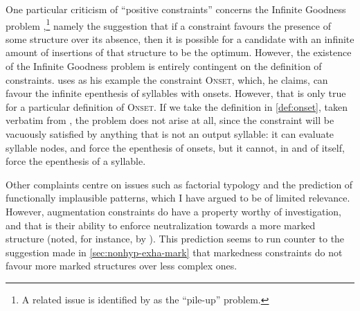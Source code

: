 One particular criticism of \enquote{positive constraints} concerns the Infinite Goodness problem \citep{prince07,kimperng:_posit_harmon_serial},\footnote{A related issue is identified by \citet{delacy2006} as the \enquote{pile\hyp up} problem.} namely the suggestion that if a constraint favours the presence of some structure over its absence, then it is possible for a candidate with an infinite amount of insertions of that structure to be the optimum. However, the existence of the Infinite Goodness problem is entirely contingent on the definition of constraints. \citet{kimperng:_posit_harmon_serial} uses as his example the constraint \textsc{Onset}, which, he claims, can favour the infinite epenthesis of syllables with onsets. However, that is only true for a particular definition of \textsc{Onset}. If we take the definition in \cref{def:onset}, taken verbatim from \citet[p.~369]{potts02:_model_ot}, the problem does not arise at all, since the constraint will be vacuously satisfied by anything that is not an output syllable: it can evaluate syllable nodes, and force the epenthesis of onsets, but it cannot, in and of itself, force the epenthesis of a syllable.

\begin{constraint}
  \label{def:onset}
\end{constraint}

Other complaints centre on issues such as factorial typology and the prediction of functionally implausible patterns, which I have argued to be of limited relevance. However, augmentation constraints do have a property worthy of investigation, and that is their ability to enforce neutralization towards a more marked structure (noted, for instance, by \citealp{moren01:_distin}). This prediction seems to run counter to the suggestion made in \cref{sec:nonhyp-exha-mark} that markedness constraints do not favour more marked structures over less complex ones.

